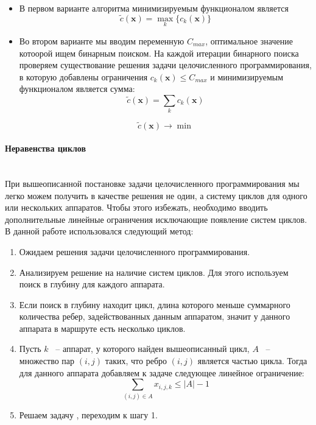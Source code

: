 \documentclass[a4paper,14pt,russian]{article}
\begin{document}
\begin{itemize}
\item В первом варианте алгоритма минимизируемым функционалом является
\begin{equation}
\widetilde{c}(\mathbf{x}) = \displaystyle\max_k \{c_k(\mathbf{x})\}
\end{equation}

\item Во втором варианте мы вводим переменную $C_{max}$, оптимальное значение котоорой ищем бинарным поиском. На каждой итерации бинарного поиска проверяем существование решения задачи целочисленного программирования, в которую добавлены ограничения $c_k(\mathbf{x}) \le C_{max}$ и минимизируемым функционалом является сумма:
\begin{equation}
\widetilde{c}(\mathbf{x}) = \displaystyle\sum_k c_k(\mathbf{x})
\end{equation}

\begin{equation} \label{lin2}
\widetilde{c}(\mathbf{x}) \rightarrow \min
\end{equation}

\end{itemize}


\paragraph{Неравенства циклов} ~\\

При вышеописанной постановке задачи целочисленного программирования мы легко можем получить в качестве решения не один, а систему циклов для одного или нескольких аппаратов. Чтобы этого избежать, необходимо вводить дополнительные линейные ограничения исключающие появление систем циклов. В данной работе использовался следующий метод:
\begin{enumerate}
\item  Ожидаем решения задачи целочисленного программирования.
\item Анализируем решение на наличие систем циклов. Для этого используем поиск в глубину для каждого аппарата.
\item Если поиск в глубину находит цикл, длина которого меньше суммарного количества ребер, задействованных данным аппаратом, значит у данного аппарата в маршруте есть несколько циклов.
\item Пусть $k$ ~-- аппарат, у которого найден вышеописанный цикл, $A$ ~-- множество пар $(i, j)$ таких, что ребро $(i, j)$ является частью цикла. Тогда для данного аппарата добавляем к задаче  следующее линейное ограничение:
\begin{equation} \label{lin3}
\displaystyle \sum_{(i,j) \in A} x_{i,j,k} \le |A| - 1
\end{equation}

\item Решаем задачу , переходим к шагу 1.
\end{enumerate}
\end{document}
